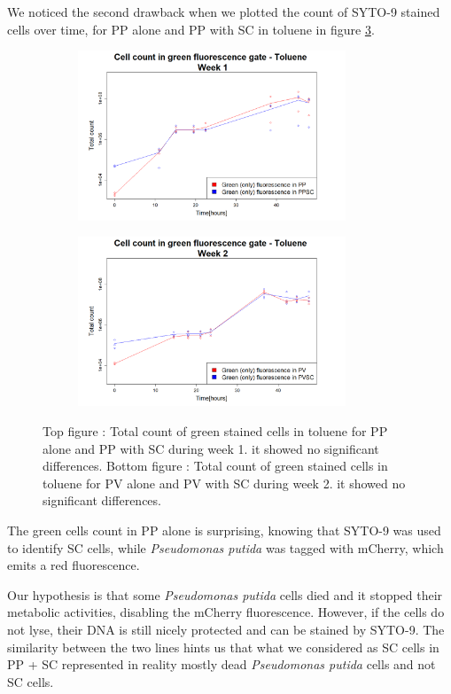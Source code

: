 \documentclass[a4paper, 10pt, conference]{ieeeconf}   %
\begin{document}
We noticed the second drawback when we plotted the count of SYTO-9 stained cells over time, for PP alone and PP with SC in toluene in figure \ref {problemsyto}. 

\begin{figure}
	 
	\begin{subfigure}{.5\textwidth}
		\centering
		\includegraphics[width=8cm]{problemw1.PNG}
		
		\label{problemw1}
	\end{subfigure}
	\begin{subfigure}{.5\textwidth}
		\centering
		\includegraphics[width=8cm]{problemw2.PNG}
		
		\label{problemw2}
	\end{subfigure}
\caption{Top figure : Total count of green stained cells in toluene for PP alone and PP with SC during week 1. it showed no significant differences. Bottom figure : Total count of green stained cells in toluene for PV alone and PV with SC during week 2. it showed no significant differences.}
\label{problemsyto}
  

\end{figure}
The green cells count in PP alone is surprising, knowing that SYTO-9 was used to identify SC cells, while \textit{Pseudomonas putida} was tagged with mCherry, which emits a red fluorescence.  

Our hypothesis is that some \textit{Pseudomonas putida} cells died and it stopped their metabolic activities, disabling the mCherry fluorescence. However, if the cells do not lyse, their DNA is still nicely protected and can be stained by SYTO-9. 
The similarity between the two lines hints us that what we considered as SC cells in PP + SC represented in reality mostly dead \textit{Pseudomonas putida} cells and not SC cells. 
\end{document}
